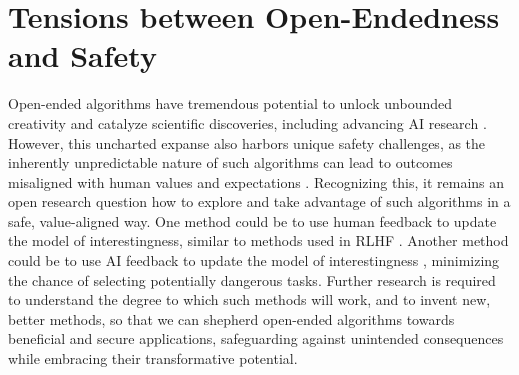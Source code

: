 \documentclass{article} %
\begin{document}
\section{Tensions between Open-Endedness and Safety}
Open-ended algorithms have tremendous potential to unlock unbounded creativity and catalyze scientific discoveries, including advancing AI research \citep{nguyen2015innovation, clune2020aigas, oreilly2023}. However, this uncharted expanse also harbors unique safety challenges, as the inherently unpredictable nature of such algorithms can lead to outcomes misaligned with human values and expectations \citep{ecoffet2020open, clune2020aigas}. Recognizing this, it remains an open research question how to explore and take advantage of such algorithms in a safe, value-aligned way. One method could be to use human feedback to update the model of interestingness, similar to methods used in RLHF \citep{christiano2017deep, ding2023quality}. Another method could be to use AI feedback to update the model of interestingness \citep{bai2022constitutional, bradley2023quality}, minimizing the chance of  selecting potentially dangerous tasks. Further research is required to understand the degree to which such methods will work, and to invent new, better methods, so that we can shepherd open-ended algorithms towards beneficial and secure applications, safeguarding against unintended consequences while embracing their transformative potential.
\end{document}
